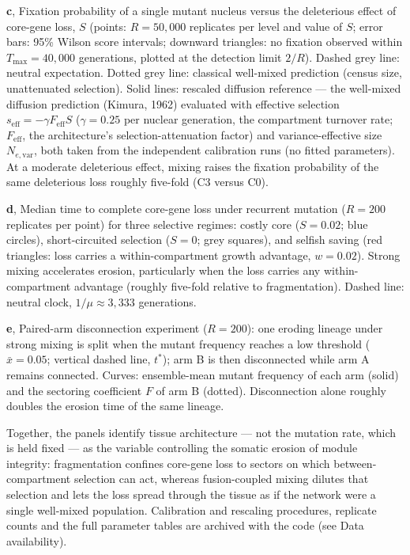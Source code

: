 \smallskip
\noindent\textbf{c}, Fixation probability of a single mutant nucleus
versus the deleterious effect of core-gene loss, $S$ (points:
$R=50{,}000$ replicates per level and value of $S$; error bars: 95\%
Wilson score intervals; downward triangles: no fixation observed within
$T_{\max}=40{,}000$ generations, plotted at the detection limit $2/R$).
Dashed grey line: neutral expectation. Dotted grey line: classical
well-mixed prediction (census size, unattenuated selection). Solid
lines: rescaled diffusion reference --- the well-mixed diffusion
prediction (Kimura, 1962) evaluated with effective selection
$s_{\mathrm{eff}}=-\gamma F_{\mathrm{eff}}S$ ($\gamma=0.25$ per nuclear
generation, the compartment turnover rate; $F_{\mathrm{eff}}$, the
architecture's selection-attenuation factor) and variance-effective size
$N_{e,\mathrm{var}}$, both taken from the independent calibration runs
(no fitted parameters). At a moderate deleterious effect, mixing raises
the fixation probability of the same deleterious loss roughly
five-fold (C3 versus C0).

\smallskip
\noindent\textbf{d}, Median time to complete core-gene loss under
recurrent mutation ($R=200$ replicates per point) for three selective
regimes: costly core ($S=0.02$; blue circles), short-circuited
selection ($S=0$; grey squares), and selfish saving (red triangles:
loss carries a within-compartment growth advantage, $w=0.02$). Strong
mixing accelerates erosion, particularly when the loss carries any
within-compartment advantage (roughly five-fold relative to
fragmentation). Dashed line: neutral clock, $1/\mu\approx3{,}333$
generations.

\smallskip
\noindent\textbf{e}, Paired-arm disconnection experiment ($R=200$): one
eroding lineage under strong mixing is split when the mutant frequency
reaches a low threshold ($\bar{x}=0.05$; vertical dashed line,
$t^{*}$); arm B is then disconnected while arm A remains connected.
Curves: ensemble-mean mutant frequency of each arm (solid) and the
sectoring coefficient $F$ of arm B (dotted). Disconnection alone
roughly doubles the erosion time of the same lineage.

\smallskip
\noindent Together, the panels identify tissue architecture --- not the
mutation rate, which is held fixed --- as the variable controlling the
somatic erosion of module integrity: fragmentation confines core-gene
loss to sectors on which between-compartment selection can act, whereas
fusion-coupled mixing dilutes that selection and lets the loss spread
through the tissue as if the network were a single well-mixed
population. Calibration and rescaling procedures, replicate counts and
the full parameter tables are archived with the code (see
Data availability).
